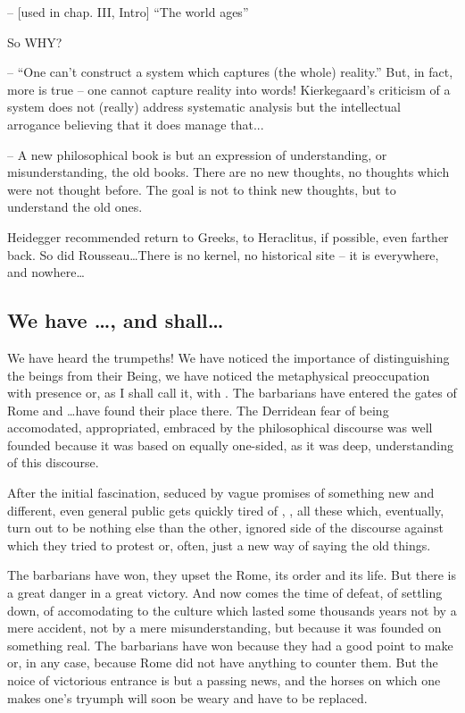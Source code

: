 {-- [used in chap. III, Intro]  ``The world ages''

So WHY?

-- ``One can't construct a system which captures (the whole) reality.'' But, in
fact, more is true -- one cannot capture reality into words! Kierkegaard's
criticism of a system does not (really) address systematic analysis but the
intellectual arrogance believing that it does manage that...

-- A new philosophical book is but an expression of understanding, or 
misunderstanding, the old books. There are no new thoughts, no 
thoughts which were not thought before. The goal is not to think new 
thoughts, but to understand the old ones. 

Heidegger recommended return to Greeks, to Heraclitus, if possible, 
even farther back. So did Rousseau\ldots There is no kernel, no 
historical site -- it is everywhere, and nowhere\ldots

\subsection{We have \ldots, and shall\ldots}

We have heard the trumpeths!  
We have noticed the importance of distinguishing the beings from 
their Being, we have noticed the metaphysical preoccupation with
presence or, as I shall call it, with . 
The barbarians have entered the gates of Rome and \ldots have found 
their place there. 
The Derridean fear of being accomodated, 
appropriated, embraced by the philosophical discourse was well 
founded because it was based on equally one-sided, as it was deep, 
understanding of this discourse.

After the initial fascination, seduced by vague promises of something 
new and different, even general public gets quickly tired of 
, 
, all these  which, eventually, 
turn out to be nothing else than the other, ignored side of the discourse 
against which they tried to protest or, often, just a new way of 
saying the old things.

\pa
The barbarians have won, they upset the Rome, its order and its life. 
But there is a great danger in a great victory. 
And now comes the time of defeat, of settling down, of accomodating to 
the culture which lasted some thousands years not by a 
mere accident, not by a mere misunderstanding,
but because it was founded on something real. The barbarians 
have won because they had a good point to make or, in any case, because 
Rome did not have anything to counter them. But the noice of 
victorious entrance is but a passing news, and the horses on which 
one makes one's tryumph will soon be weary and have to be replaced. 

}
